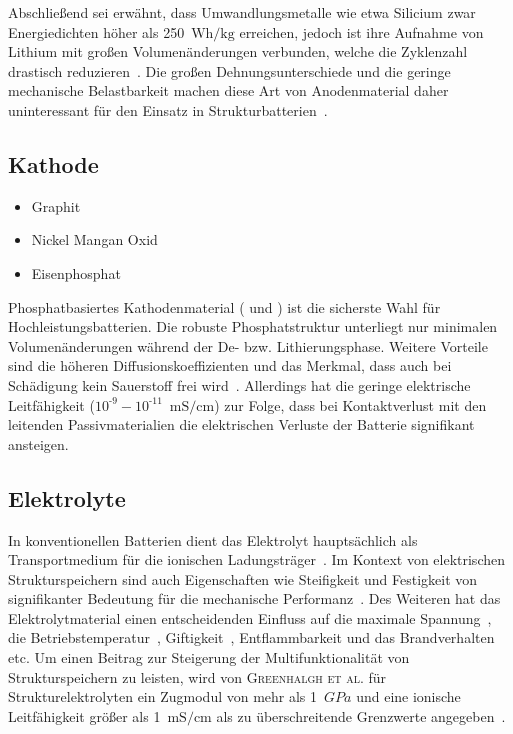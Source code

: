 

Abschließend sei erwähnt, dass Umwandlungsmetalle wie etwa Silicium zwar Energiedichten höher als 250~$\si{\watt \hour \per \kg}$ erreichen, jedoch ist ihre Aufnahme von Lithium mit großen Volumenänderungen verbunden, welche die Zyklenzahl drastisch reduzieren~\cite{Gayet2009, Pereira2019}. Die großen Dehnungsunterschiede und die geringe mechanische Belastbarkeit machen diese Art von Anodenmaterial daher uninteressant für den Einsatz in Strukturbatterien~\cite{Javaid2018}.

\subsection{Kathode}

\begin{itemize}
	\item Graphit
	\item Nickel Mangan Oxid
	\item Eisenphosphat
\end{itemize}

Phosphatbasiertes Kathodenmaterial ( und ) ist die sicherste Wahl für Hochleistungsbatterien. Die robuste Phosphatstruktur unterliegt nur minimalen Volumenänderungen während der De- bzw. Lithierungsphase. Weitere Vorteile sind die höheren Diffusionskoeffizienten und das Merkmal, dass auch bei Schädigung kein Sauerstoff frei wird~\cite{Ling2021}. Allerdings hat die geringe elektrische Leitfähigkeit ($10^{\text{-}9}-10^{\text{-}11}$~$\si{\milli \siemens \per \cm}$) zur Folge, dass bei Kontaktverlust mit den leitenden Passivmaterialien die elektrischen Verluste der Batterie signifikant ansteigen.

\subsection{Elektrolyte}
In konventionellen Batterien dient das Elektrolyt hauptsächlich als Transportmedium für die ionischen Ladungsträger~\cite{Gerlach2020}. Im Kontext von elektrischen Strukturspeichern sind auch Eigenschaften wie Steifigkeit und Festigkeit von signifikanter Bedeutung für die mechanische Performanz~\cite{Greenhalgh2023}. Des Weiteren hat das Elektrolytmaterial einen entscheidenden Einfluss auf die maximale Spannung~\cite{Xu2016}, die Betriebstemperatur~\cite{Chen2022a}, Giftigkeit~\cite{Beard2019}, Entflammbarkeit und das Brandverhalten~\cite{Roth2012} etc. Um einen Beitrag zur Steigerung der Multifunktionalität von Strukturspeichern zu leisten, wird von \textsc{Greenhalgh et al.} für Strukturelektrolyten ein Zugmodul von mehr als 1~$\si{GPa}$ und eine ionische Leitfähigkeit größer als 1~$\si{\milli \siemens \per \cm}$ als zu überschreitende Grenzwerte angegeben~\cite{Greenhalgh2023}.


